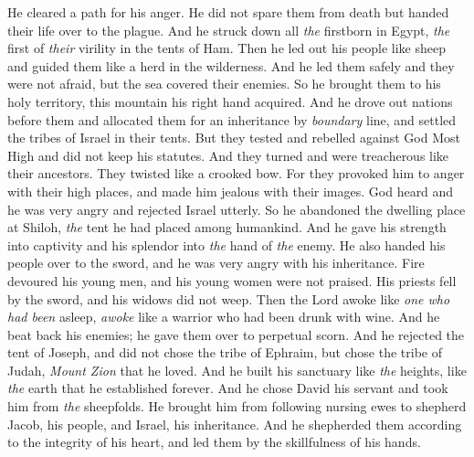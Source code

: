 \begin{biblechapter}
\verse He cleared a path for his anger. 
He did not spare them from death 
but handed their life over to the plague.
\verse And he struck down all \textit{the} firstborn in Egypt, 
\textit{the} first of \textit{their} virility in the tents of Ham.
\verse Then he led out his people like sheep 
and guided them like a herd in the wilderness.
\verse And he led them safely and they were not afraid, 
but the sea covered their enemies.
\verse So he brought them to his holy territory, 
this mountain his right hand acquired.
\verse And he drove out nations before them 
and allocated them for an inheritance by \textit{boundary} line, 
and settled the tribes of Israel in their tents.
\verse But they tested and rebelled against God Most High 
and did not keep his statutes.
\verse And they turned and were treacherous like their ancestors. 
They twisted like a crooked bow.
\verse For they provoked him to anger with their high places, 
and made him jealous with their images.
\verse God heard and he was very angry 
and rejected Israel utterly.
\verse So he abandoned the dwelling place at Shiloh, 
\textit{the} tent he had placed among humankind.
\verse And he gave his strength into captivity 
and his splendor into \textit{the} hand of \textit{the} enemy.
\verse He also handed his people over to the sword, 
and he was very angry with his inheritance.
\verse Fire devoured his young men, 
and his young women were not praised.
\verse His priests fell by the sword, 
and his widows did not weep.
\verse Then the Lord awoke like \textit{one who had been} asleep, 
\textit{awoke} like a warrior who had been drunk with wine.
\verse And he beat back his enemies; 
he gave them over to perpetual scorn.
\verse And he rejected the tent of Joseph, 
and did not chose the tribe of Ephraim,
\verse but chose the tribe of Judah, 
\textit{Mount Zion} that he loved.
\verse And he built his sanctuary like \textit{the} heights, 
like \textit{the} earth that he established forever.
\verse And he chose David his servant 
and took him from \textit{the} sheepfolds.
\verse He brought him from following nursing ewes 
to shepherd Jacob, his people, 
and Israel, his inheritance.
\verse And he shepherded them according to the integrity of his heart, 
and led them by the skillfulness of his hands.
\end{biblechapter}

